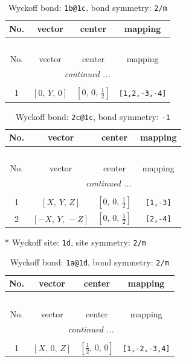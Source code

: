 \documentclass[fleqn,8pt]{jsarticle}
\begin{document}
\begin{longtable}{cccc}
\caption{Wyckoff bond: {\tt 1b@1c}, bond symmetry: {\tt 2/m}}
 \\
 \hline \hline
No. & vector & center & mapping \\ \hline \endfirsthead

\multicolumn{3}{l}{\tablename\ \thetable{}} \\
 \hline \hline
No. & vector & center & mapping \\ \hline \endhead

 \hline \hline
\multicolumn{3}{r}{\footnotesize\it continued ...} \\ \endfoot

 \hline \hline
\multicolumn{3}{r}{} \\ \endlastfoot

1 & $\left[ 0,\, Y,\, 0 \right]$ & $\left[ 0,\, 0,\, \frac{1}{2} \right]$ & {\tt [1,2,-3,-4]} \\
\end{longtable}
\renewcommand{\arraystretch}{1.2}
\begin{longtable}{cccc}
\caption{Wyckoff bond: {\tt 2c@1c}, bond symmetry: {\tt -1}}
 \\
 \hline \hline
No. & vector & center & mapping \\ \hline \endfirsthead

\multicolumn{3}{l}{\tablename\ \thetable{}} \\
 \hline \hline
No. & vector & center & mapping \\ \hline \endhead

 \hline \hline
\multicolumn{3}{r}{\footnotesize\it continued ...} \\ \endfoot

 \hline \hline
\multicolumn{3}{r}{} \\ \endlastfoot

1 & $\left[ X,\, Y,\, Z \right]$ & $\left[ 0,\, 0,\, \frac{1}{2} \right]$ & {\tt [1,-3]} \\ \hline
2 & $\left[ - X,\, Y,\, - Z \right]$ & $\left[ 0,\, 0,\, \frac{1}{2} \right]$ & {\tt [2,-4]} \\
\end{longtable}
* Wyckoff site: {\tt 1d}, site symmetry: {\tt 2/m}
\renewcommand{\arraystretch}{1.2}
\begin{longtable}{cccc}
\caption{Wyckoff bond: {\tt 1a@1d}, bond symmetry: {\tt 2/m}}
 \\
 \hline \hline
No. & vector & center & mapping \\ \hline \endfirsthead

\multicolumn{3}{l}{\tablename\ \thetable{}} \\
 \hline \hline
No. & vector & center & mapping \\ \hline \endhead

 \hline \hline
\multicolumn{3}{r}{\footnotesize\it continued ...} \\ \endfoot

 \hline \hline
\multicolumn{3}{r}{} \\ \endlastfoot

1 & $\left[ X,\, 0,\, Z \right]$ & $\left[ \frac{1}{2},\, 0,\, 0 \right]$ & {\tt [1,-2,-3,4]} \\
\end{longtable}
\end{document}
